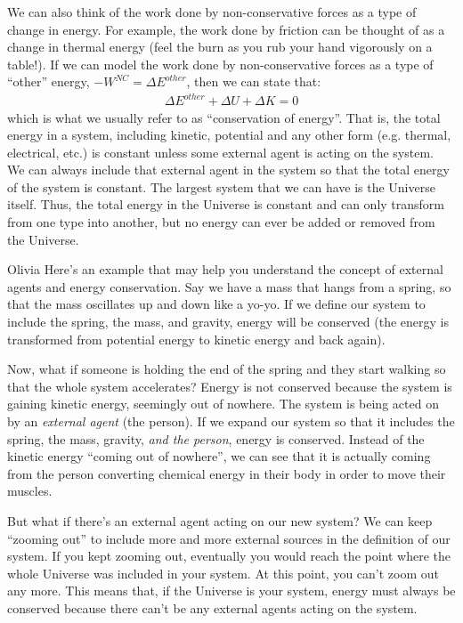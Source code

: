 We can also think of the work done by non-conservative forces as a type of change in energy. For example, the work done by friction can be thought of as a change in thermal energy (feel the burn as you rub your hand vigorously on a table!). If we can model the work done by non-conservative forces as a type of ``other'' energy, $-W^{NC}=\Delta E^{other}$, then we can state that:
\begin{align*}
\Delta E^{other} + \Delta U + \Delta K =0
\end{align*}
which is what we usually refer to as ``conservation of energy''. That is, the total energy in a system, including kinetic, potential and any other form (e.g. thermal, electrical, etc.) is constant unless some external agent is acting on the system. \\

We can always include that external agent in the system so that the total energy of the system is constant. The largest system that we can have is the Universe itself. Thus, the total energy in the Universe is constant and can only transform from one type into another, but no energy can ever be added or removed from the Universe.

\begin{studentOpinion}{Olivia}
Here's an example that may help you understand the concept of external agents and energy conservation. Say we have a mass that hangs from a spring, so that the mass oscillates up and down like a yo-yo. If we define our system to include the spring, the mass, and gravity, energy will be conserved (the energy is transformed from potential energy to kinetic energy and back again). 

Now, what if someone is holding the end of the spring and they start walking so that the whole system accelerates? Energy is not conserved because the system is gaining kinetic energy, seemingly out of nowhere. The system is being acted on by an \textit{external agent} (the person). If we expand our system so that it includes the spring, the mass, gravity, \textit{and the person}, energy is conserved. Instead of the kinetic energy ``coming out of nowhere'', we can see that it is actually coming from the person converting chemical energy in their body in order to move their muscles.

But what if there's an external agent acting on our new system? We can keep ``zooming out'' to include more and more external sources in the definition of our system. If you kept zooming out, eventually you would reach the point where the whole Universe was included in your system. At this point, you can't zoom out any more. This means that, if the Universe is your system, energy must always be conserved because there can't be any external agents acting on the system. 
\end{studentOpinion}


